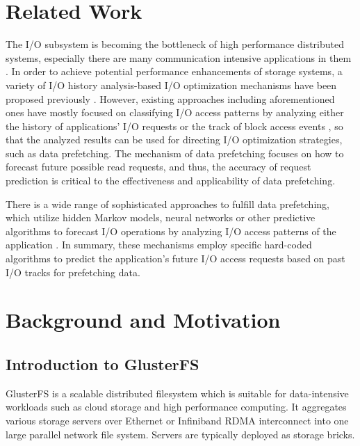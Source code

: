 \documentclass[conference]{IEEEtran}
\begin{document}
\section{Related Work}
The I/O subsystem is becoming the bottleneck of high performance distributed systems, 
especially there are many communication intensive applications in them \cite{Related_Network_I/O_load_based}.
In order to achieve potential performance enhancements of storage systems, 
a variety of I/O history analysis-based I/O optimization mechanisms have been proposed previously 
\cite{Related_Multi_Layer_Event_Trace_Analysis} \cite{Related_Towards_an_I/O_tracing_framework_taxonomy} \cite{Related_DiskSeen} \cite{A_Prefetching_Scheme_Related} \cite{Scalable_IO_Tracing_Related}.
However, existing approaches including aforementioned ones have mostly focused on classifying I/O access patterns by analyzing either the history of applications’ I/O requests
\cite{Parallel_IO_Prefetching_Related} \cite{Learning_To_Classify_Related}
or the track of block access events \cite{Related_DiskSeen} \cite{A_Prefetching_Scheme_Related}, 
so that the analyzed results can be used for directing I/O optimization strategies, such as data prefetching.
The mechanism of data prefetching focuses on how to forecast future possible read requests, and thus, 
the accuracy of request prediction is critical to the effectiveness and applicability of data prefetching.

There is a wide range of sophisticated approaches to fulﬁll data prefetching, 
which utilize hidden Markov models, 
neural networks or other predictive algorithms to forecast I/O operations by analyzing I/O access patterns of the application 
\cite{Parallel_IO_Prefetching_Related} \cite{IO_Acceleration_with_Related} \cite{An_Automatic_Prefetching_Related} \cite{Reducing_File_System_Latency_Related} \cite{Automatic_ARIMA_Related}.
In summary, these mechanisms employ specific hard-coded algorithms to predict the application's future I/O access requests based on past I/O tracks for prefetching data.

\section{Background and Motivation}
\subsection{Introduction to GlusterFS}
GlusterFS is a scalable distributed filesystem which is suitable for data-intensive workloads such as cloud storage and high performance computing.
It aggregates various storage servers over Ethernet or Infiniband RDMA interconnect into one large parallel network file system.
Servers are typically deployed as storage bricks.
\end{document}

